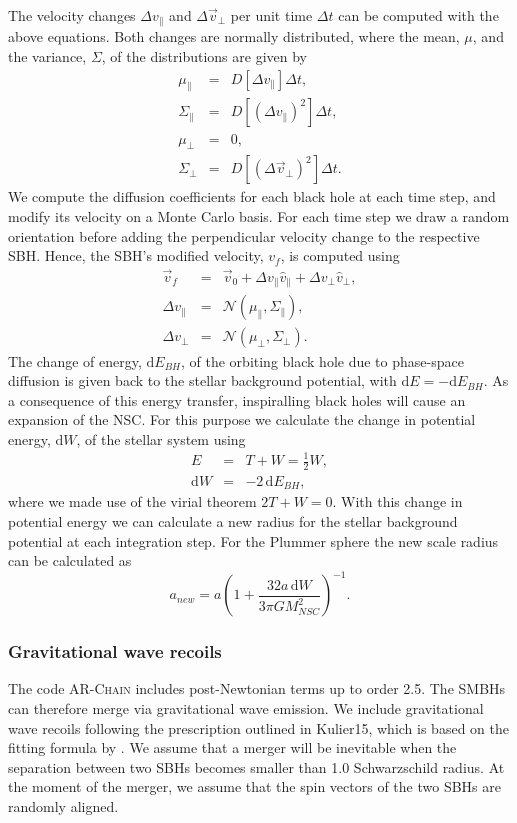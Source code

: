 \documentclass[english, apj]{emulateapj}
\begin{document}
The velocity changes $\Delta v_\parallel$ and $\Delta\vec{v}_\bot$ per unit time $\Delta t$ can be computed with the above equations. Both changes are normally distributed, where the mean, $\mu$, and the variance, $\Sigma$, of the distributions are given by
\begin{eqnarray}
\mu_\parallel &=& D[\Delta v_\parallel]\Delta t,\\
\Sigma_\parallel &=& D[(\Delta v_\parallel)^2]\Delta t,\\
\mu_\bot &=& 0,\\
\Sigma_\bot &=& D[(\Delta \vec{v}_\bot)^2]\Delta t.
\end{eqnarray}
We compute the diffusion coefficients for each black hole at each time step, and modify its velocity on a Monte Carlo basis. For each time step we draw a random orientation before adding the perpendicular velocity change to the respective SBH. Hence, the SBH's modified velocity, $v_f$, is computed using
\begin{eqnarray}
\vec{v}_f &=& \vec{v}_0 + \Delta v_\parallel \hat{v}_\parallel + \Delta v_\bot \hat{v}_\bot,\\
\Delta v_\parallel &=& \mathcal{N}(\mu_\parallel, \Sigma_\parallel),\\
\Delta v_\bot &=& \mathcal{N}(\mu_\bot, \Sigma_\bot).
\end{eqnarray}
The change of energy, $\mbox{d}E_{BH}$, of the orbiting black hole due to phase-space diffusion is given back to the stellar background potential, with $\mbox{d}E = -\mbox{d}E_{BH}$. As a consequence of this energy transfer, inspiralling black holes will cause an expansion of the NSC. For this purpose we calculate the change in potential energy, $\mbox{d}W$, of the stellar system using
\begin{eqnarray}
E &=& T + W = \frac{1}{2}W,\\
\mbox{d}W &=& -2\,\mbox{d}E_{BH},
\end{eqnarray}
where we made use of the virial theorem $2T+W =0$. With this change in potential energy we can calculate a new radius for the stellar background potential at each integration step. For the Plummer sphere the new scale radius can be calculated as
\begin{equation}
a_{new} = a\left(1+\frac{32a\,\mbox{d}W}{3\pi GM_{NSC}^2}\right)^{-1}.
\end{equation}

\subsubsection{Gravitational wave recoils}
The code \textsc{AR-Chain} includes post-Newtonian terms up to order 2.5. The SMBHs can therefore merge via gravitational wave emission. We include gravitational wave recoils following the prescription outlined in Kulier15, which is based on the fitting formula by \citet{2012PhRvD..85h4015L}.  We assume that a merger will be inevitable when the separation between two SBHs becomes smaller than 1.0 Schwarzschild radius. At the moment of the merger, we assume that the spin vectors of the two SBHs are randomly aligned.
\end{document}
